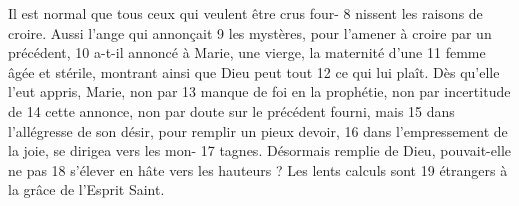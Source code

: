 	Il est normal que tous ceux qui veulent être crus four-	 
8	 	nissent les raisons de croire. Aussi l'ange qui annonçait	 
9	 	les mystères, pour l'amener à croire par un précédent,	 
10	 	a-t-il annoncé à Marie, une vierge, la maternité d'une	 
11	 	femme âgée et stérile, montrant ainsi que Dieu peut tout	 
12	 	ce qui lui plaît. Dès qu'elle l'eut appris, Marie, non par	 
13	 	manque de foi en la prophétie, non par incertitude de	 
14	 	cette annonce, non par doute sur le précédent fourni, mais	 
15	 	dans l'allégresse de son désir, pour remplir un pieux devoir,	 
16	 	dans l'empressement de la joie, se dirigea vers les mon-	 
17	 	tagnes. Désormais remplie de Dieu, pouvait-elle ne pas	 
18	 	s'élever en hâte vers les hauteurs ? Les lents calculs sont	 
19	 	étrangers à la grâce de l'Esprit Saint.